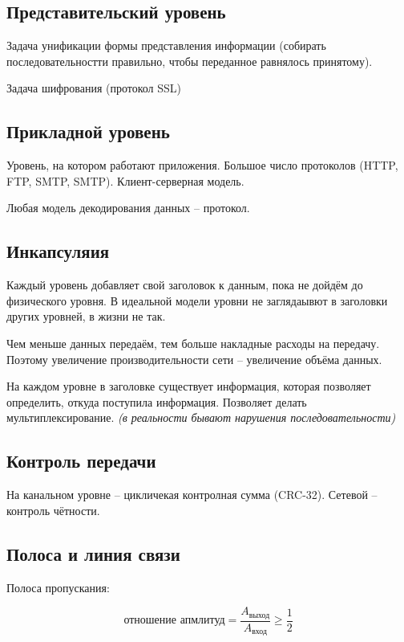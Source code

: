 \subsection{Представительский уровень}

Задача унификации формы представления информации (собирать последовательностти правильно, чтобы переданное равнялось принятому).

Задача шифрования (протокол SSL)

\subsection{Прикладной уровень}

Уровень, на котором работают приложения. Большое число протоколов (HTTP, FTP, SMTP, SMTP). Клиент-серверная модель.

Любая модель декодирования данных – протокол.

\subsection{Инкапсуляия}

Каждый уровень добавляет свой заголовок к данным, пока не дойдём до физического уровня. В идеальной модели уровни не заглядаывют в заголовки других уровней, в жизни не так.

Чем меньше данных передаём, тем больше накладные расходы на передачу. Поэтому увеличение производительности сети – увеличение объёма данных.

На каждом уровне в заголовке существует информация, которая позволяет определить, откуда поступила информация. Позволяет делать мультиплексирование. \textit{(в реальности бывают нарушения последовательности)}

\subsection{Контроль передачи}

На канальном уровне – цикличекая контролная сумма (CRC-32). Сетевой – контроль чётности.

\subsection{Полоса и линия связи}

Полоса пропускания:

\[
\text{отношение апмлитуд} = \frac{A_{\text{выход}}}{A_{\text{вход}}} \geq \frac{1}{2}
\]

